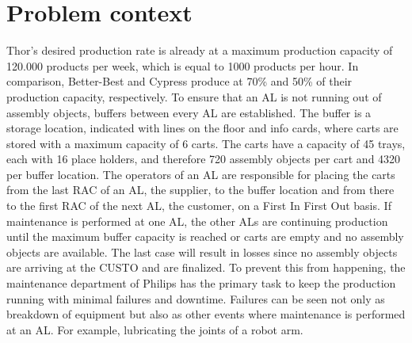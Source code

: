 \section{Problem context} \label{Problem Context}
Thor's desired production rate is already at a maximum production capacity of 120.000 products per week, which is equal to 1000 products per hour. In comparison, Better-Best and Cypress produce at 70\% and 50\% of their production capacity, respectively. To ensure that an AL is not running out of assembly objects, buffers between every AL are established. The buffer is a storage location, indicated with lines on the floor and info cards, where carts are stored with a maximum capacity of 6 carts. The carts have a capacity of 45 trays, each with 16 place holders, and therefore 720 assembly objects per cart and 4320 per buffer location. The operators of an AL are responsible for placing the carts from the last RAC of an AL, the supplier, to the buffer location and from there to the first RAC of the next AL, the customer, on a First In First Out basis. If maintenance is performed at one AL, the other ALs are continuing  production until the maximum buffer capacity is reached or carts are empty and no assembly objects are available. The last case will result in losses since no assembly objects are arriving at the CUSTO and are finalized. To prevent this from happening, the maintenance department of Philips has the primary task to keep the production running with minimal failures and downtime. Failures can be seen not only as breakdown of equipment but also as other events where maintenance is performed at an AL. For example, lubricating the joints of a robot arm. 
